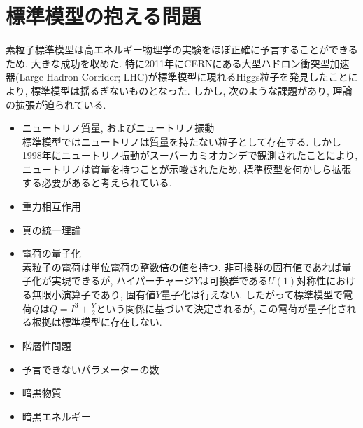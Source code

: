 %
%
\section{標準模型の抱える問題}
素粒子標準模型は高エネルギー物理学の実験をほぼ正確に予言することができるため, 大きな成功を収めた.
特に2011年にCERNにある大型ハドロン衝突型加速器(Large Hadron Corrider; LHC)が標準模型に現れるHiggs粒子を発見したことにより, 標準模型は揺るぎないものとなった.
しかし, 次のような課題があり, 理論の拡張が迫られている.
\begin{itemize}
        \item ニュートリノ質量, およびニュートリノ振動\\
              標準模型ではニュートリノは質量を持たない粒子として存在する.
              しかし1998年にニュートリノ振動がスーパーカミオカンデで観測されたことにより, ニュートリノは質量を持つことが示唆されたため, 標準模型を何かしら拡張する必要があると考えられている.
      \item 重力相互作用
      \item 真の統一理論
      \item 電荷の量子化\\
            素粒子の電荷は単位電荷の整数倍の値を持つ.
            非可換群の固有値であれば量子化が実現できるが, ハイパーチャージ$Y$は可換群である$U(1)$対称性における無限小演算子であり, 固有値$Y$量子化は行えない.
            したがって標準模型で電荷$Q$は$Q = I^3 + \frac{Y}{2}$という関係に基づいて決定されるが, この電荷が量子化される根拠は標準模型に存在しない.
      \item 階層性問題
      \item 予言できないパラメーターの数
      \item 暗黒物質
      \item 暗黒エネルギー
\end{itemize}

